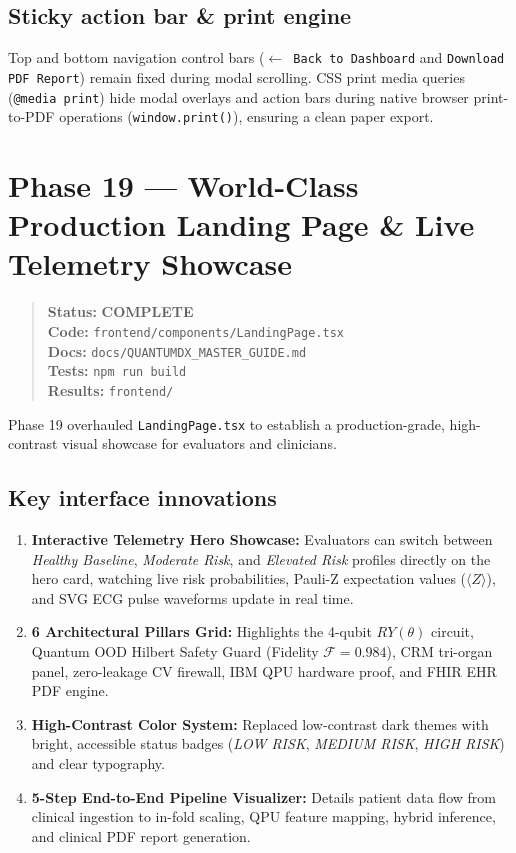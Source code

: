 \documentclass[11pt,a4paper]{article}
\newcommand{\code}[1]{\texttt{\small #1}}
\newcommand{\done}{\textcolor{donecolor}{\textbf{COMPLETE}}}
\newcommand{\phasestatus}[5]{%
\begin{quote}\small\raggedright
\textbf{Status:} #1 \\
\textbf{Code:} #2 \\
\textbf{Docs:} #3 \\
\textbf{Tests:} #4 \\
\textbf{Results:} #5
\end{quote}}
\begin{document}
\subsection{Sticky action bar \& print engine}
Top and bottom navigation control bars (\code{$\leftarrow$ Back to Dashboard} and \code{Download PDF Report}) remain fixed during modal scrolling. CSS print media queries (\code{@media print}) hide modal overlays and action bars during native browser print-to-PDF operations (\code{window.print()}), ensuring a clean paper export.

\section{Phase 19 --- World-Class Production Landing Page \& Live Telemetry Showcase}
\label{sec:phase19}

\phasestatus{\done}{\code{frontend/components/LandingPage.tsx}}{\code{docs/QUANTUMDX\_MASTER\_GUIDE.md}}{\code{npm run build}}{\code{frontend/}}

Phase 19 overhauled \code{LandingPage.tsx} to establish a production-grade, high-contrast visual showcase for evaluators and clinicians.

\subsection{Key interface innovations}
\begin{enumerate}[leftmargin=1.4em]
  \item \textbf{Interactive Telemetry Hero Showcase:} Evaluators can switch between \emph{Healthy Baseline}, \emph{Moderate Risk}, and \emph{Elevated Risk} profiles directly on the hero card, watching live risk probabilities, Pauli-Z expectation values ($\langle Z \rangle$), and SVG ECG pulse waveforms update in real time.
  \item \textbf{6 Architectural Pillars Grid:} Highlights the 4-qubit $RY(\theta)$ circuit, Quantum OOD Hilbert Safety Guard (Fidelity $\mathcal{F} = 0.984$), CRM tri-organ panel, zero-leakage CV firewall, IBM QPU hardware proof, and FHIR EHR PDF engine.
  \item \textbf{High-Contrast Color System:} Replaced low-contrast dark themes with bright, accessible status badges (\emph{LOW RISK}, \emph{MEDIUM RISK}, \emph{HIGH RISK}) and clear typography.
  \item \textbf{5-Step End-to-End Pipeline Visualizer:} Details patient data flow from clinical ingestion to in-fold scaling, QPU feature mapping, hybrid inference, and clinical PDF report generation.
\end{enumerate}
\end{document}
